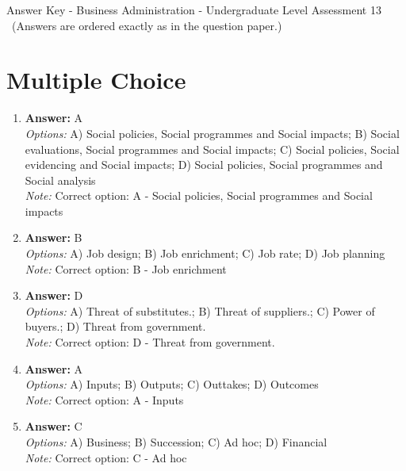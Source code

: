 \documentclass[12pt]{article}
\begin{document}
\begin{center}
Answer Key - Business Administration - Undergraduate Level Assessment 13 \
\small (Answers are ordered exactly as in the question paper.)
\end{center}

\section*{Multiple Choice}
\begin{enumerate}[label=\arabic*.]
\item \textbf{Answer:} A
\\ \textit{Options:} A) Social policies, Social programmes and Social impacts; B) Social evaluations, Social programmes and Social impacts; C) Social policies, Social evidencing and Social impacts; D) Social policies, Social programmes and Social analysis
\\ \textit{Note:} Correct option: A - Social policies, Social programmes and Social impacts
\item \textbf{Answer:} B
\\ \textit{Options:} A) Job design; B) Job enrichment; C) Job rate; D) Job planning
\\ \textit{Note:} Correct option: B - Job enrichment
\item \textbf{Answer:} D
\\ \textit{Options:} A) Threat of substitutes.; B) Threat of suppliers.; C) Power of buyers.; D) Threat from government.
\\ \textit{Note:} Correct option: D - Threat from government.
\item \textbf{Answer:} A
\\ \textit{Options:} A) Inputs; B) Outputs; C) Outtakes; D) Outcomes
\\ \textit{Note:} Correct option: A - Inputs
\item \textbf{Answer:} C
\\ \textit{Options:} A) Business; B) Succession; C) Ad hoc; D) Financial
\\ \textit{Note:} Correct option: C - Ad hoc
\end{enumerate}
\end{document}
